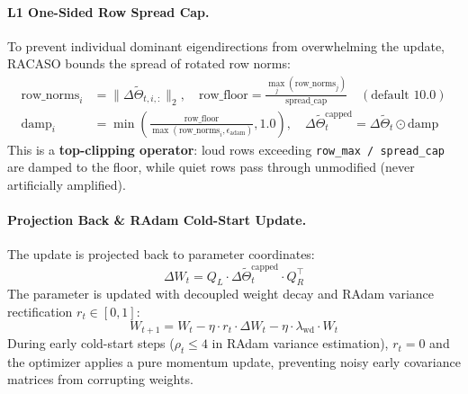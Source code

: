 \documentclass[11pt,a4paper]{article}
\begin{document}
\paragraph{L1 One-Sided Row Spread Cap.}
To prevent individual dominant eigendirections from overwhelming the update, RACASO bounds the spread of rotated row norms:
\begin{align}
\text{row\_norms}_i &= \|\Delta \tilde{\Theta}_{t, i, :}\|_2, \quad \text{row\_floor} = \frac{\max_j(\text{row\_norms}_j)}{\text{spread\_cap}} \quad (\text{default } 10.0) \\
\text{damp}_i &= \min\left(\frac{\text{row\_floor}}{\max(\text{row\_norms}_i, \epsilon_{\text{adam}})}, 1.0\right), \quad \Delta \tilde{\Theta}_t^{\text{capped}} = \Delta \tilde{\Theta}_t \odot \text{damp}
\end{align}
This is a \textbf{top-clipping operator}: loud rows exceeding \texttt{row\_max / spread\_cap} are damped to the floor, while quiet rows pass through unmodified (never artificially amplified).

\paragraph{Projection Back \& RAdam Cold-Start Update.}
The update is projected back to parameter coordinates:
\begin{equation}
\Delta W_t = Q_L \cdot \Delta \tilde{\Theta}_t^{\text{capped}} \cdot Q_R^\top
\end{equation}
The parameter is updated with decoupled weight decay and RAdam variance rectification $r_t \in [0, 1]$:
\begin{equation}
W_{t+1} = W_t - \eta \cdot r_t \cdot \Delta W_t - \eta \cdot \lambda_{\text{wd}} \cdot W_t
\end{equation}
During early cold-start steps ($\rho_t \le 4$ in RAdam variance estimation), $r_t = 0$ and the optimizer applies a pure momentum update, preventing noisy early covariance matrices from corrupting weights.
\end{document}
